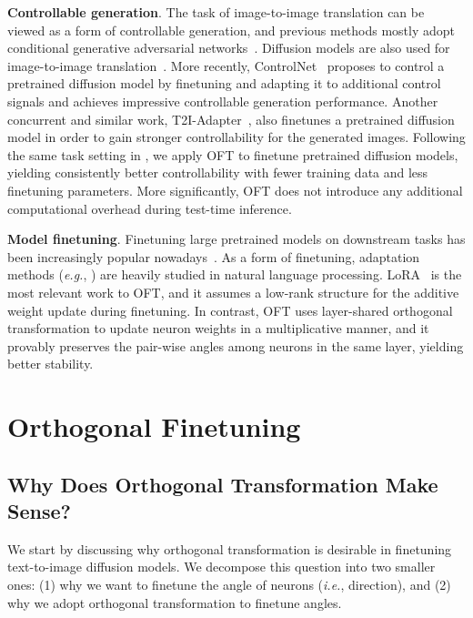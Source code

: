 \textbf{Controllable generation}. The task of image-to-image translation can be viewed as a form of controllable generation, and previous methods mostly adopt conditional generative adversarial networks~\cite{isola2017image,zhu2017toward,wang2018high,park2019semantic,choi2018stargan}. Diffusion models are also used for image-to-image translation~\cite{saharia2022palette,voynov2022sketch,wang2022pretraining}. More recently, ControlNet~\cite{zhang2023adding} proposes to control a pretrained diffusion model by finetuning and adapting it to additional control signals and achieves impressive controllable generation performance. Another concurrent and similar work, T2I-Adapter~\cite{mou2023t2i}, also finetunes a pretrained diffusion model in order to gain stronger controllability for the generated images. Following the same task setting in \cite{zhang2023adding,mou2023t2i}, we apply OFT to finetune pretrained diffusion models, yielding consistently better controllability with fewer training data and less finetuning parameters. More significantly, OFT does not introduce any additional computational overhead during test-time inference.

\textbf{Model finetuning}. Finetuning large pretrained models on downstream tasks has been increasingly popular nowadays~\cite{devlin2018bert,brown2020language,he2022masked}. As a form of finetuning, adaptation methods (\emph{e.g.}, \cite{hulora2022,houlsby2019parameter,pfeiffer2020adapterfusion}) are heavily studied in natural language processing. LoRA~\cite{hulora2022} is the most relevant work to OFT, and it assumes a low-rank structure for the additive weight update during finetuning. In contrast, OFT uses layer-shared orthogonal transformation to update neuron weights in a multiplicative manner, and it provably preserves the pair-wise angles among neurons in the same layer, yielding better stability.

\section{Orthogonal Finetuning}

\subsection{Why Does Orthogonal Transformation Make Sense?}

We start by discussing why orthogonal transformation is desirable in finetuning text-to-image diffusion models. We decompose this question into two smaller ones: (1) why we want to finetune the angle of neurons (\emph{i.e.}, direction), and (2) why we adopt orthogonal transformation to finetune angles.

